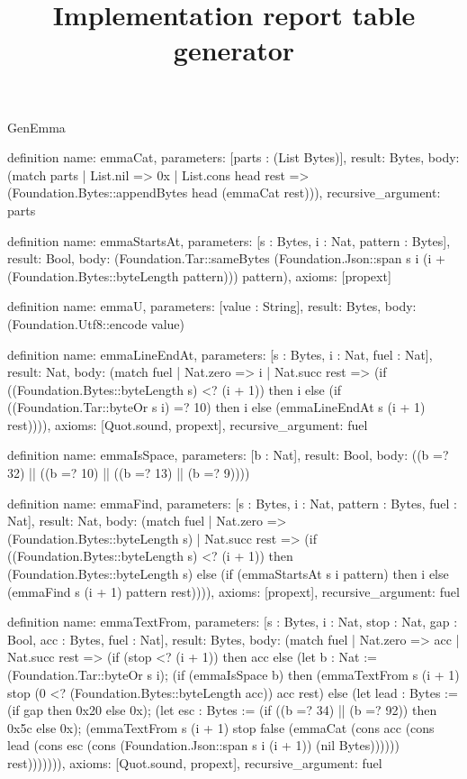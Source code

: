 \begin{lexlean}{GenEmma}
\title{Implementation report table generator}
\begin{semanticmodule}
definition{
  name: emmaCat,
  parameters: [parts : (List Bytes)],
  result: Bytes,
  body: (match parts
    | List.nil => 0x
    | List.cons head rest => (Foundation.Bytes::appendBytes head (emmaCat rest))),
  recursive_argument: parts
}

definition{
  name: emmaStartsAt,
  parameters: [s : Bytes, i : Nat, pattern : Bytes],
  result: Bool,
  body: (Foundation.Tar::sameBytes (Foundation.Json::span s i (i + (Foundation.Bytes::byteLength pattern))) pattern),
  axioms: [propext]
}

definition{
  name: emmaU,
  parameters: [value : String],
  result: Bytes,
  body: (Foundation.Utf8::encode value)
}

definition{
  name: emmaLineEndAt,
  parameters: [s : Bytes, i : Nat, fuel : Nat],
  result: Nat,
  body: (match fuel
    | Nat.zero => i
    | Nat.succ rest => (if ((Foundation.Bytes::byteLength s) <? (i + 1)) then i else (if ((Foundation.Tar::byteOr s i) =? 10) then i else (emmaLineEndAt s (i + 1) rest)))),
  axioms: [Quot.sound, propext],
  recursive_argument: fuel
}

definition{
  name: emmaIsSpace,
  parameters: [b : Nat],
  result: Bool,
  body: ((b =? 32) || ((b =? 10) || ((b =? 13) || (b =? 9))))
}

definition{
  name: emmaFind,
  parameters: [s : Bytes, i : Nat, pattern : Bytes, fuel : Nat],
  result: Nat,
  body: (match fuel
    | Nat.zero => (Foundation.Bytes::byteLength s)
    | Nat.succ rest => (if ((Foundation.Bytes::byteLength s) <? (i + 1)) then (Foundation.Bytes::byteLength s) else (if (emmaStartsAt s i pattern) then i else (emmaFind s (i + 1) pattern rest)))),
  axioms: [propext],
  recursive_argument: fuel
}

definition{
  name: emmaTextFrom,
  parameters: [s : Bytes, i : Nat, stop : Nat, gap : Bool, acc : Bytes, fuel : Nat],
  result: Bytes,
  body: (match fuel
    | Nat.zero => acc
    | Nat.succ rest => (if (stop <? (i + 1)) then acc else (let b : Nat := (Foundation.Tar::byteOr s i); (if (emmaIsSpace b) then (emmaTextFrom s (i + 1) stop (0 <? (Foundation.Bytes::byteLength acc)) acc rest) else (let lead : Bytes := (if gap then 0x20 else 0x); (let esc : Bytes := (if ((b =? 34) || (b =? 92)) then 0x5c else 0x); (emmaTextFrom s (i + 1) stop false (emmaCat (cons acc (cons lead (cons esc (cons (Foundation.Json::span s i (i + 1)) (nil Bytes)))))) rest))))))),
  axioms: [Quot.sound, propext],
  recursive_argument: fuel
}


\end{semanticmodule}
\end{lexlean}

